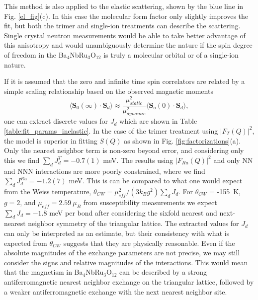 \documentclass[%
 reprint,
superscriptaddress,
 amsmath,amssymb,
 aps,
 prb,
]{revtex4-2}
\begin{document}
This method is also applied to the elastic scattering, shown by the blue line in Fig. \ref{el_fig}(c). In this case the molecular form factor only slightly improves the fit, but both the trimer and single-ion treatments can describe the scattering. Single crystal neutron measurements would be able to take better advantage of this anisotropy and would unambiguously determine the nature if the spin degree of freedom in the Ba$_4$NbRu$_3$O$_{12}$ is truly a molecular orbital or of a single-ion nature. 

If it is assumed that the zero and infinite time spin correlators are related by a simple scaling relationship based on the observed magnetic moments
\begin{equation}
\langle \textbf{S}_0(\infty)\cdot\textbf{S}_d\rangle \approx \frac{\mu_{static}^2}{\mu_{dynamic}^2} \langle
\textbf{S}_o(0)\cdot\textbf{S}_d\rangle,
\label{eq:moment_scale}
\end{equation}
one can extract discrete values for $J_d$ which are shown in Table \ref{table:fit_params_inelastic}. In the case of the trimer treatment using $|F_{T}(Q)|^2$, the model is superior in fitting $S(Q)$ as shown in Fig. \ref{fig:factorizations}(a). Only the nearest neighbor term is non-zero beyond error, and considering only this we find $\sum_d J^{T}_d = -0.7(1)$ meV. The results using $|F_{Ru}(Q)|^2$ and only NN and NNN interactions are more poorly constrained, where we find $\sum_d J^{Ru}_d = -1.2(7)$ meV. This is can be compared to what one would expect from the Weiss temperature, $\theta_{CW} = \mu_{eff}^2 / (3k_Bg^2)\sum_d J_d$. For $\theta_{CW}$ = -155~K, $g=2$, and $\mu_{eff}=2.59~\mu_B$ from susceptibility measurements we expect $\sum_d J_d=-1.8$ meV per bond after considering the sixfold nearest and next-nearest neighbor symmetry of the triangular lattice. The extracted values for $J_d$ can only be interpreted as an estimate, but their consistency with what is expected from $\theta_{CW}$ suggests that they are physically reasonable. Even if the absolute magnitudes of the exchange parameters are not precise, we may still consider the signs and relative magnitudes of the interactions. This would mean that the magnetism in Ba$_4$NbRu$_3$O$_{12}$ can be described by a strong antiferromagnetic nearest neighbor exchange on the triangular lattice, followed by a weaker antiferromagnetic exchange with the next nearest neighbor site.  
\end{document}
